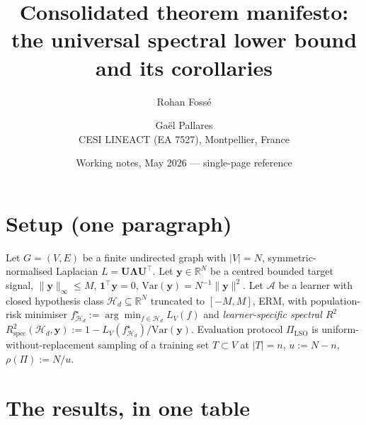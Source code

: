 \documentclass[10pt,a4paper]{article}
\title{\textbf{Consolidated theorem manifesto:\\
the universal spectral lower bound and its corollaries}}
\author{Rohan Fossé \and Gaël Pallares\\
\small{CESI LINEACT (EA 7527), Montpellier, France}}
\date{Working notes, May 2026 — single-page reference}
\newcommand{\by}{\mathbf{y}}
\newcommand{\bU}{\mathbf{U}}
\newcommand{\bone}{\mathbf{1}}
\newcommand{\R}{\mathbb{R}}
\newcommand{\Var}{\mathrm{Var}}
\newcommand{\Rspec}{R^2_{\mathrm{spec}}}
\newcommand{\Hcal}{\mathcal{H}}
\newcommand{\Acal}{\mathcal{A}}
\begin{document}
\maketitle

\section*{Setup (one paragraph)}

Let $G = (V, E)$ be a finite undirected graph with $|V| = N$,
symmetric-normalised Laplacian $L = \bU \boldsymbol{\Lambda} \bU^\top$.
Let $\by \in \R^N$ be a centred bounded target signal,
$\|\by\|_\infty \leq M$, $\bone^\top \by = 0$,
$\Var(\by) = N^{-1}\|\by\|^2$.  Let $\Acal$ be a learner with closed
hypothesis class $\Hcal_d \subseteq \R^N$ truncated to $[-M, M]$, ERM,
with population-risk minimiser $f^\star_{\Hcal_d} := \arg\min_{f \in
\Hcal_d} L_V(f)$ and \emph{learner-specific spectral $R^2$}
$\Rspec(\Hcal_d, \by) := 1 - L_V(f^\star_{\Hcal_d})/\Var(\by)$.
Evaluation protocol $\Pi_{\mathrm{LSO}}$ is uniform-without-replacement
sampling of a training set $T \subset V$ at $|T| = n$, $u := N - n$,
$\rho(\Pi) := N/u$.

\section*{The results, in one table}
\end{document}
